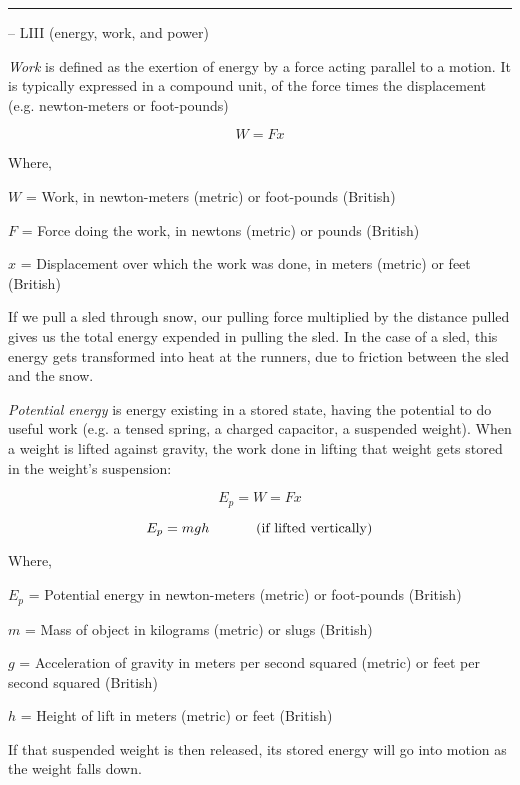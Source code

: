 \begin{itemize}
\begin{itemize}
\filbreak \vskip 5pt \hrule \vskip 5pt  -- LIII (energy, work, and power) \vskip 10pt

{\it Work} is defined as the exertion of energy by a force acting parallel to a motion.  It is typically expressed in a compound unit, of the force times the displacement (e.g. newton-meters or foot-pounds)

$$W = Fx$$

\noindent
Where,

$W$ = Work, in newton-meters (metric) or foot-pounds (British)

$F$ = Force doing the work, in newtons (metric) or pounds (British)

$x$ = Displacement over which the work was done, in meters (metric) or feet (British)

\vskip 10pt

If we pull a sled through snow, our pulling force multiplied by the distance pulled gives us the total energy expended in pulling the sled.  In the case of a sled, this energy gets transformed into heat at the runners, due to friction between the sled and the snow.

\vskip 10pt

{\it Potential energy} is energy existing in a stored state, having the potential to do useful work (e.g. a tensed spring, a charged capacitor, a suspended weight).  When a weight is lifted against gravity, the work done in lifting that weight gets stored in the weight's suspension:
 
$$E_p = W = Fx$$

$$E_p = mgh \hbox{ \hskip 30pt (if lifted vertically)}$$

\noindent
Where,

$E_p$ = Potential energy in newton-meters (metric) or foot-pounds (British)

$m$ = Mass of object in kilograms (metric) or slugs (British)

$g$ = Acceleration of gravity in meters per second squared (metric) or feet per second squared (British)

$h$ = Height of lift in meters (metric) or feet (British)

\vskip 10pt

If that suspended weight is then released, its stored energy will go into motion as the weight falls down.

\vskip 10pt


\end{itemize}
\end{itemize}

